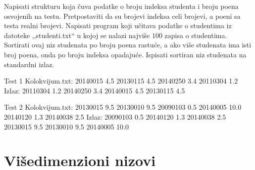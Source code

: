 \begin{Exercise}[label=313]
Napisati strukturu  koja čuva podatke o broju
indeksa studenta i broju poena osvojenih na testu. Pretpostaviti
da su brojevi indeksa celi brojevi, a poeni sa testa realni
brojevi. Napisati program koji učitava podatke o studentima iz
datoteke ,,studenti.txt`` u kojoj se nalazi najviše $100$
zapisa o studentima. Sortirati ovaj niz studenata po broju poena
rastuće, a ako više studenata ima isti broj poena, onda po
broju indeksa opadajuće. Ispisati sortiran niz studenata na
standardni izlaz.

\begin{miditest}
\begin{test}{Test 1}
Kolokvijum.txt:   20140015 4.5
                  20130115 4.5
                  20140250 3.4
                  20110304 1.2
Izlaz:            20110304 1.2
                  20140250 3.4
                  20140015 4.5
                  20130115 4.5
\end{test}
\end{miditest}
\begin{miditest}
\begin{test}{Test 2}
Kolokvijum.txt:   20130015 9.5
                  20130010 9.5
                  20090103 0.5
                  20140005 10.0
                  20140120 1.3
                  20140038 2.5
Izlaz:            20090103 0.5
                  20140120 1.3
                  20140038 2.5
                  20130015 9.5
                  20130010 9.5
                  20140005 10.0
\end{test}
\end{miditest}
\end{Exercise}
\begin{Answer}[ref=313]
\end{Answer}

\section{Višedimenzioni nizovi}

